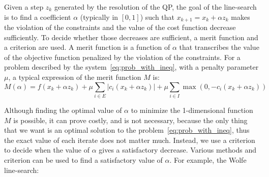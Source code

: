 Given a step $z_k$ generated by the resolution of the QP, the goal of the line-search is to find a coefficient $\alpha$ (typically in $[0,1]$) such that $x_{k+1}=x_k + \alpha z_k$ makes the violation of the constraints and the value of the cost function decrease sufficiently.
To decide whether those decreases are sufficient, a merit function and a criterion are used.
A merit function is a function of $\alpha$ that transcribes the value of the objective function penalized by the violation of the constraints.
For a problem described by the system~\ref{eq:prob_with_ineq}, with a penalty parameter $\mu$, a typical expression of the merit function $M$ is:
\begin{equation}
  M(\alpha) = f(x_k +\alpha z_k) + \mu \sum_{i\in E} \left| c_i(x_k+\alpha z_k) \right| + \mu \sum_{i\in I} \max \left(0,-c_i(x_k + \alpha z_k)\right)
\end{equation}

Although finding the optimal value of $\alpha$ to minimize the 1-dimensional function $M$ is possible, it can prove costly, and is not necessary, because the only thing that we want is an optimal solution to the problem~\ref{eq:prob_with_ineq}, thus the exact value of each iterate does not matter much.
Instead, we use a criterion to decide when the value of $\alpha$ gives a satisfactory decrease.
Various methods and criterion can be used to find a satisfactory value of $\alpha$.
For example, the Wolfe line-search:





